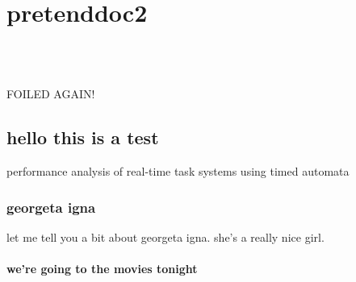 \chapter{pretenddoc2}
\label{pretenddoc2}

\quad\\

\quad\\

\newpage

\noindent FOILED AGAIN!

\section{hello this is a test}
performance analysis of real-time task systems using timed automata

\subsection{georgeta igna}
let me tell you a bit about georgeta igna. she's a really nice girl.

\subsubsection{we're going to the movies tonight}